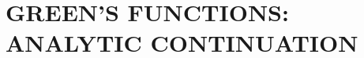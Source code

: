 \documentclass[../dissertation.tex]{subfiles}
\begin{document}
\chapter{GREEN'S FUNCTIONS: ANALYTIC CONTINUATION}\label{cptr03:xContin}





% 





% 




% 




% 

\end{document}
